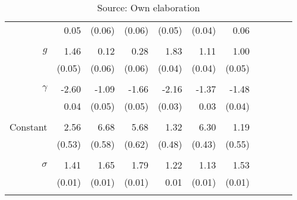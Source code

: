 \begin{table}[ht]
\begin{tabular}{rrrrrrrrrrr}
           & 0.05 & (0.06) & (0.06) & (0.05) & (0.04) & 0.06 \\
& & \\
  $g$      & 1.46 & 0.12 & 0.28 & 1.83 & 1.11 & 1.00 \\
  		     & (0.05) & (0.06) & (0.06) & (0.04) & (0.04) & (0.05) \\
& & \\
  $\gamma$ & -2.60 & -1.09 & -1.66 & -2.16 & -1.37 & -1.48 \\
  			   & 0.04 & (0.05) & (0.05) & (0.03) & 0.03 & (0.04) \\
& & \\  
  Constant & 2.56 & 6.68 & 5.68 & 1.32 & 6.30 & 1.19 \\
  			   & (0.53) & (0.58) & (0.62) & (0.48) & (0.43) & (0.55) \\
& & \\  
  \hline
  $\sigma$ & 1.41 & 1.65 & 1.79 & 1.22 & 1.13 & 1.53 \\
  		     & (0.01) & (0.01) & (0.01) & 0.01 & (0.01) & (0.01) \\
& & \\
\bottomrule
\end{tabular}
\caption*{Source: Own elaboration}
\end{table}
